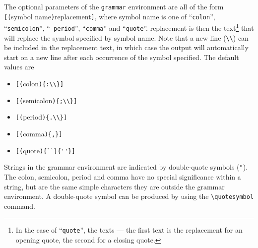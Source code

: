 The optional parameters of the {\tt grammar} environment are all of the
form \verb![(!{\sc symbol name}\verb!)!{\sc replacement}\verb!]!, where
{\sc symbol name} is one of ``{\tt colon}'', ``{\tt semicolon}'', ``{\tt
period}'', ``{\tt comma}'' and ``{\tt quote}''. {\sc replacement} is then the text\footnote{In the case of ``{\tt quote}'', the texts --- the first text
is the replacement for an opening quote, the second for a closing quote.} that
will replace the symbol specified by {\sc symbol name}. Note that a new
line (\verb!\\!) can be included in the replacement text, in which case
the output will automatically start on a new line after each occurrence
of the symbol specified. The default values are
\begin{itemize}
  \item \verb![(!colon\verb!){:\\}]!
  \item \verb![(!semicolon\verb!){;\\}]!
  \item \verb![(!period\verb!){.\\}]!
  \item \verb![(!comma\verb!){,}]!
  \item \verb![(!quote\verb!){``}{''}]!
\end{itemize}

Strings in the grammar environment are indicated by double-quote symbols
(\verb!"!). The colon, semicolon, period and comma have no special
significance within a string, but are the same simple characters they
are outside the grammar environment. A double-quote symbol can be
produced by using the \verb!\quotesymbol! command.

